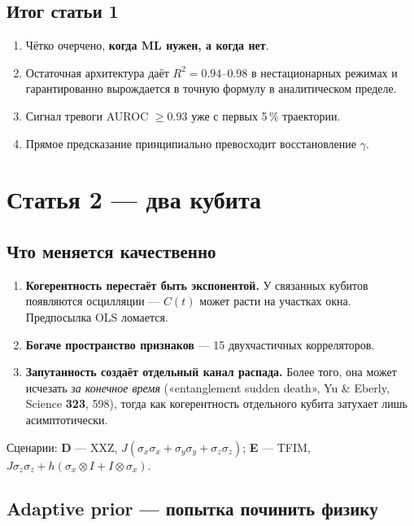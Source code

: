 \documentclass[12pt,a4paper]{article}
\begin{document}
\subsection{Итог статьи 1}

\begin{enumerate}
  \item Чётко очерчено, \textbf{когда ML нужен, а когда нет}.
  \item Остаточная архитектура даёт $R^2=0.94$–$0.98$ в нестационарных режимах
        и гарантированно вырождается в точную формулу в аналитическом пределе.
  \item Сигнал тревоги AUROC $\geq 0.93$ уже с первых 5\,\% траектории.
  \item Прямое предсказание принципиально превосходит восстановление $\gamma$.
\end{enumerate}

\section{Статья 2 — два кубита}

\subsection{Что меняется качественно}

\begin{enumerate}
  \item \textbf{Когерентность перестаёт быть экспонентой.} У связанных кубитов
        появляются осцилляции — $C(t)$ может расти на участках окна.
        Предпосылка OLS ломается.
  \item \textbf{Богаче пространство признаков} — 15 двухчастичных корреляторов.
  \item \textbf{Запутанность создаёт отдельный канал распада.} Более того, она
        может исчезать \emph{за конечное время} («entanglement sudden death»,
        Yu \& Eberly, Science \textbf{323}, 598), тогда как когерентность
        отдельного кубита затухает лишь асимптотически.
\end{enumerate}

Сценарии: \textbf{D} — XXZ,
$J(\sigma_x\sigma_x+\sigma_y\sigma_y+\sigma_z\sigma_z)$;
\textbf{E} — TFIM, $J\sigma_z\sigma_z+h(\sigma_x\otimes I+I\otimes\sigma_x)$.

\subsection{Adaptive prior — попытка починить физику}
\end{document}
